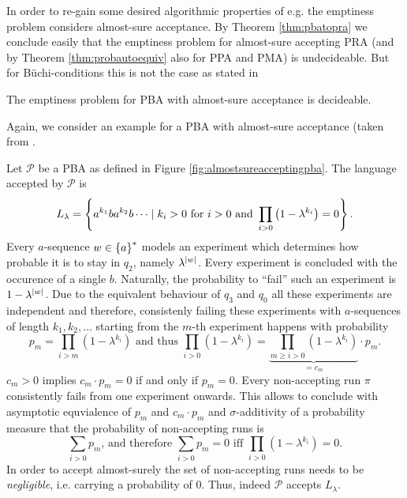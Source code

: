 In order to re-gain some desired algorithmic properties of e.g. the emptiness
problem \cite{DecProblemsForProbAuto} considers almost-sure acceptance. By
Theorem \ref{thm:pbatopra} we conclude easily that the emptiness problem for
almost-sure accepting \ac{PRA} (and by Theorem \ref{thm:probautoequiv} also for
\ac{PPA} and \ac{PMA}) is undecideable. But for Büchi-conditions this is not
the case as stated in
\begin{theorem}
  \cite[Theorem 6]{DecProblemsForProbAuto}
  The emptiness problem for \ac{PBA} with almost-sure acceptance is decideable.
  \label{thm:emptinessalmostsurepba}
\end{theorem}
Again, we consider an example for a \ac{PBA} with almost-sure acceptance (taken
from \cite{DecProblemsForProbAuto}.
\begin{example}
  Let $\mathcal{P}$ be a \ac{PBA} as defined in Figure 
  \ref{fig:almostsureacceptingpba}. The language accepted by $\mathcal{P}$ is
  \begin{equation*}
    L_{\lambda} = \left\{a^{k_{1}}ba^{k_{2}}b\dots\mid k_{i}>0\text{ for }i>0
    \text{ and }\prod\limits_{i>0}\left(1-\lambda^{k_{i}}\right) = 0\right\}.
  \end{equation*}
  Every $a$-sequence $w\in\left\{a\right\}^{*}$ models an experiment which determines 
  how probable it is to stay in $q_{2}$, namely $\lambda^{\left\vert{w}\right\vert}$. Every 
  experiment is concluded with the occurence of a single $b$.  Naturally, the 
  probability to \enquote{fail} such an experiment is $1-\lambda^{\left\vert{w}\right\vert}$. 
  Due to the equivalent behaviour of $q_{3}$ and $q_{0}$ all these experiments 
  are independent and therefore, consistenly failing these experiments with 
  $a$-sequences of length $k_{1}, k_{2},\dots$ starting from the $m$-th 
  experiment happens with probability
  \begin{equation*}
    p_{m} = \prod\limits_{i>m}(1-\lambda^{k_{i}})
    \text{ and thus }
    \prod\limits_{i>0}(1-\lambda^{k_{i}}) = 
    \underbrace{\prod\limits_{m\geq i>0}(1-\lambda^{k_{i}})}_{=c_{m}}
    \cdot p_{m}.
  \end{equation*}
  $c_{m} > 0$ implies $c_{m}\cdot p_{m} = 0$ if and only if 
  $p_{m} = 0$.
  Every non-accepting run $\pi$ consistently fails from one experiment onwards.
  This allows to conclude with asymptotic equvialence of $p_{m}$ and 
  $c_{m}\cdot p_{m}$ and $\sigma$-additivity of a probability measure that the 
  probability of non-accepting runs is
  \begin{equation*}
    \sum_{i > 0} p_{m}\text{, and therefore }
    \sum_{i > 0} p_{m} = 0\text{ iff }\prod\limits_{i>0}(1-\lambda^{k_{i}}) =0.
  \end{equation*}
  In order to accept almost-surely the set of non-accepting runs needs to be
  \emph{negligible}, i.e. carrying a probability of $0$.  Thus, indeed 
  $\mathcal{P}$ accepts $L_{\lambda}$.


\end{example}

